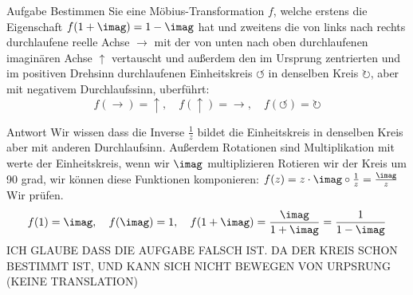 \documentclass{scrartcl}
\let\*\cdot
\begin{document}
\begin{section}{Aufgabe}%
    Bestimmen Sie eine Möbius-Transformation $f$, welche erstens die Eigenschaft $f(1 + \imag) = 1 - \imag$
hat und zweitens die von links nach rechts durchlaufene reelle Achse $\rightarrow$ mit der von unten nach oben durchlaufenen imaginären Achse $\uparrow$ vertauscht und außerdem den im
Ursprung zentrierten und im positiven Drehsinn durchlaufenen Einheitskreis $\circlearrowleft$ in denselben Kreis $\circlearrowright$, aber mit negativem Durchlaufssinn, uberführt: 
\[f(\rightarrow)=\uparrow,\quad f(\uparrow)=\rightarrow,\quad f(\circlearrowleft)=\circlearrowright\]
\end{section}
\begin{subsection}{Antwort}
    Wir wissen dass die Inverse $\frac{1}{z}$ bildet die Einheitskreis in denselben Kreis aber mit anderen Durchlaufsinn. Außerdem Rotationen sind Multiplikation mit werte der Einheitskreis, wenn wir $\imag$ multiplizieren Rotieren wir der Kreis um 90 grad, wir können diese Funktionen komponieren:
    $f(z)=z\*\imag\circ \frac{1}{z}=\frac{\imag}{z}$
    Wir prüfen.
    \[f(1)=\imag,\quad f(\imag)=1,\quad f(1+\imag)=\frac{\imag}{1+\imag}=\frac{1}{1-\imag}\]
    ICH GLAUBE DASS DIE AUFGABE FALSCH IST. DA DER KREIS SCHON BESTIMMT IST, UND KANN SICH NICHT BEWEGEN VON URPSRUNG (KEINE TRANSLATION)
\end{subsection}
\end{document}
